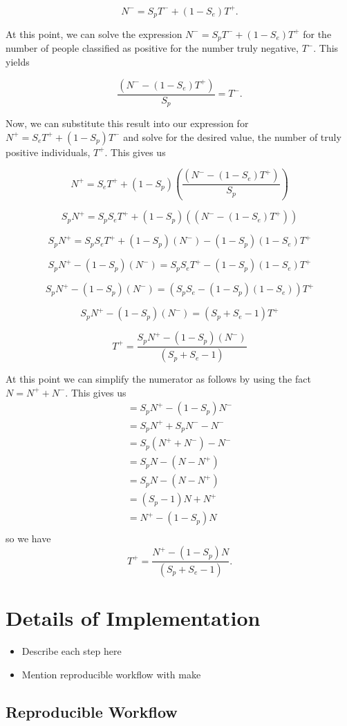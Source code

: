 \documentclass[12pt,twoside]{smiththesis}
\providecommand{\tightlist}{%
  \setlength{\itemsep}{0pt}\setlength{\parskip}{0pt}}
\begin{document}
\[ N^- = S_p T^- + (1-S_e) T^+.\]

At this point, we can solve the expression \(N^- = S_p T^- + (1-S_e) T^+\) for the number of people classified as positive for the number truly negative, \(T^-\). This yields

\[\dfrac{( N^- - (1-S_e) T^+) }{S_p}=  T^- .\]

Now, we can substitute this result into our expression for \(N^+ =S_e T^+ + (1-S_p) T^-\) and solve for the desired value, the number of truly positive individuals, \(T^+\). This gives us

\[
 N^+ =S_e T^+ + (1-S_p)  \left( \dfrac{( N^- - (1-S_e) T^+) }{S_p} \right)
\]

\[
 S_pN^+ =S_pS_e T^+ + (1-S_p)  \left( {( N^- - (1-S_e) T^+) } \right)
\]

\[
 S_pN^+ =S_pS_e T^+ + (1-S_p)  ( N^-)  - (1-S_p)(1-S_e) T^+
\]

\[
 S_pN^+ -   (1-S_p)  ( N^-) =S_pS_e T^+  - (1-S_p)(1-S_e) T^+
\]

\[
 S_pN^+ -   (1-S_p)  ( N^-) = (S_pS_e  - (1-S_p)(1-S_e)) T^+
\]

\[
 S_pN^+ -   (1-S_p)  ( N^-) = (S_p + S_e - 1) T^+
\]

\[
 T^+ = \dfrac{ S_pN^+ -   (1-S_p)  ( N^-)}{(S_p + S_e - 1)} 
\]

At this point we can simplify the numerator as follows by using the fact \(N = N^+ + N^-\). This gives us
\begin{align*} =S_pN^+ -   (1-S_p)  N^-\\
=  S_pN^+ + S_p  N^- - N^-\\
=  S_p(N^+ +  N^-) - N^- \\
=  S_pN - (N-N^+) \\
=  S_pN - (N-N^+) \\
=  (S_p-1)N + N^+ \\
=    N^+ - (1-S_p)N\\
\end{align*}
so we have
\[
 T^+ = \dfrac{  N^+ - (1-S_p)N}{(S_p + S_e - 1)}.
\]

\hypertarget{details-of-implementation}{%
\chapter{Details of Implementation}\label{details-of-implementation}}
\begin{itemize}
\tightlist
\item
  Describe each step here
\item
  Mention reproducible workflow with make
\end{itemize}
\hypertarget{reproducible-workflow}{%
\section{Reproducible Workflow}\label{reproducible-workflow}}
\end{document}
